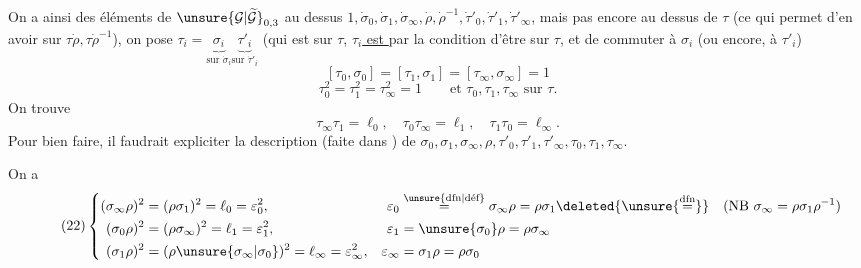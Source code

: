 On a ainsi des éléments de $\unsure{\mathcal G|\widetilde{\mathcal G}}_{0,3}$ au dessus 
$1,\dot\sigma_0,\dot\sigma_1,\dot\sigma_\infty,\dot\rho,\dot\rho^{-1},\dot\tau'_0,\dot\tau'_1,\dot\tau'_\infty$,
mais pas encore au dessus de $\tau$ (ce qui permet d'en avoir sur $\tau\dot\rho,\tau\dot\rho^{-1}$),
on pose
$\tau_i=\underbrace{\sigma_i}_{\text{sur }\dot\sigma_i}\underbrace{\tau'_i}_{\text{sur }\dot\tau'_i}$
(qui est sur $\tau$, 
\uline{$\tau_i$ est } 
par la condition d'être sur $\tau$,  et de commuter à $\sigma_i$ (ou encore, à $\tau'_i$)
\[
\tag{19}
[\tau_0,\sigma_0]=[\tau_1,\sigma_1]=[\tau_\infty,\sigma_\infty]=1
\]
\[
\tag{20}
\tau_0^2=\tau_1^2=\tau_\infty^2=1
\qquad\text{et }\tau_0,\tau_1,\tau_\infty\text{ sur }\tau.
\]
On trouve
\[
\tag{21}
\tau_\infty\tau_1=\ell_0,\quad\tau_0\tau_\infty=\ell_1,\quad\tau_1\tau_0=\ell_\infty.
\]
Pour bien faire, il faudrait expliciter la description  (faite dans \unsure{[C]|[TC]}) de
$\sigma_0,\sigma_1,\sigma_\infty,\rho,\tau'_0,\tau'_1,\tau'_\infty,\tau_0,\tau_1,\tau_\infty$.



On a
\[
\tag{22}
\left\{\begin{aligned}
(\sigma_\infty\rho)^2&=(\rho\sigma_1)^2=\ell_0=\varepsilon_0^2,&
\varepsilon_0&\overset{\unsure{\text{dfn}|\text{déf}}}{=}\sigma_\infty\rho=\rho\sigma_1\deleted{\unsure{\overset{\mathrm{dfn}}{=}}}
\quad(\mathrm{NB}\ \sigma_\infty=\rho\sigma_1\rho^{-1})\\
(\sigma_0\rho)^2&=(\rho\sigma_\infty)^2=\ell_1=\varepsilon_1^2,&
\varepsilon_1&=\unsure{\sigma_0}\rho=\rho\sigma_\infty\\
(\sigma_1\rho)^2&=(\rho\unsure{\sigma_\infty|\sigma_0})^2=\ell_\infty=\varepsilon_\infty^2,&
\varepsilon_\infty&=\sigma_1\rho=\rho\sigma_0
\end{aligned}\right.
\]

